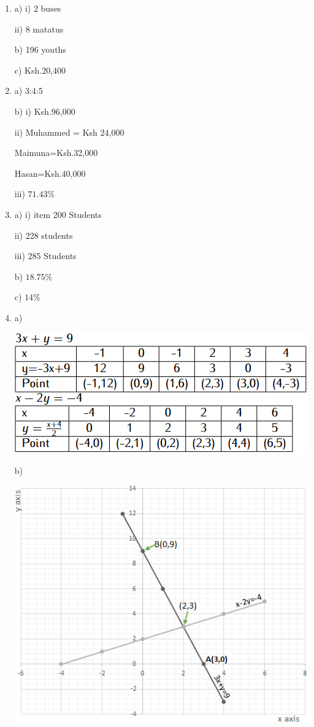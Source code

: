 \documentclass[
  a4paperpaper,
]{scrbook}
\begin{document}
\begin{tcolorbox}
\begin{enumerate}
\def\labelenumi{\arabic{enumi}.}
\setcounter{enumi}{16}
\item
  a) i) 2 buses

  ii) 8 matatus

  b) 196 youths

  c) Ksh.20,400
\item
  a) 3:4:5

  b) i) Ksh.96,000

  ii) Muhammed = Ksh 24,000

  Maimuna=Ksh.32,000

  Hasan=Ksh.40,000

  iii) \(71.43\%\)
\item
  a) i) item 200 Students

  ii) 228 students

  iii) 285 Students

  b) \(18.75\%\)

  c) \(14\%\)
\item
  a)

  \includegraphics{figures/M7N20a.png}

  b)

  \includegraphics{figures/M7N20.png}


\end{enumerate}
\end{tcolorbox}
\end{document}
